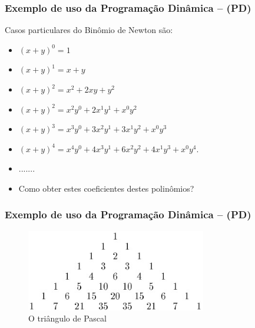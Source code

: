 \begin{frame}[fragile]

\frametitle{Exemplo de uso da Programação Dinâmica -- (PD)}

Casos particulares do Binômio de Newton são:
\begin{itemize}
  \item  ${\left(x + y\right)}^0 = 1$
  \item  ${\left(x + y\right)}^1 = x + y$
  \item  ${\left(x + y\right)}^2 = x^2 + 2xy + y^2$
  
  \pause
  \item  ${\left(x + y\right)}^2 = x^2y^0 + 2x^1y^1 + x^0y^2$
  \item  ${\left(x + y\right)}^3 = x^3y^0 + 3x^2y^1 + 3x^1y^2 + x^0y^3$
  \item  ${\left(x + y\right)}^4 = x^4y^0 + 4x^3y^1 + 6x^2y^2 + 4x^1y^3 + x^0y^4.$
    \item  .......
    \pause
 \item Como obter estes coeficientes destes polinômios?  

\end{itemize}

    
\end{frame}


\begin{frame}[fragile]

\frametitle{Exemplo de uso da Programação Dinâmica -- (PD)}

\begin{figure}[!htb]
\centering
\includegraphics[width=0.70\textwidth, height=0.60\textheight]{figures/pascal_triangle_01.jpg}
\caption{O triângulo de Pascal}
\end{figure}

   
\end{frame}




